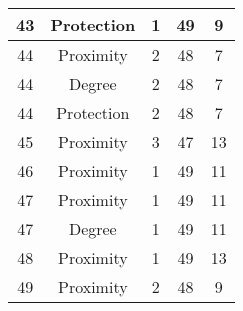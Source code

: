 \documentclass[results.tex]{subfiles}
\begin{document}
\begin{center}
\begin{tabular}{| c || c | c | c | c |}
            \hline
            43                      & Protection                   & 1                      & 49                      & 9                    \\
            \hline
            44                      & Proximity                    & 2                      & 48                      & 7                    \\
            \hline
            44                      & Degree                       & 2                      & 48                      & 7                    \\
            \hline
            44                      & Protection                   & 2                      & 48                      & 7                    \\
            \hline
            45                      & Proximity                    & 3                      & 47                      & 13                   \\
            \hline
            46                      & Proximity                    & 1                      & 49                      & 11                   \\
            \hline
            47                      & Proximity                    & 1                      & 49                      & 11                   \\
            \hline
            47                      & Degree                       & 1                      & 49                      & 11                   \\
            \hline
            48                      & Proximity                    & 1                      & 49                      & 13                   \\
            \hline
            49                      & Proximity                    & 2                      & 48                      & 9                    \\
            \hline
        \end{tabular}
    \end{center}
\end{document}
